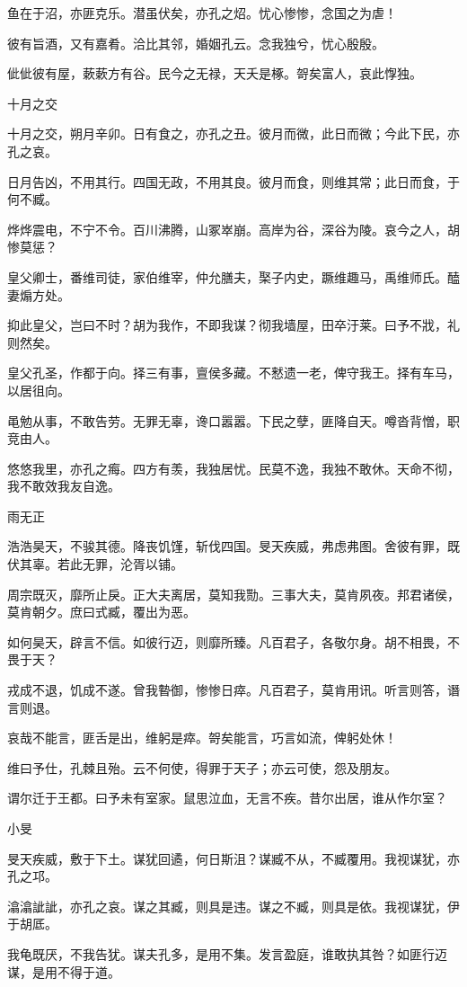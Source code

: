 鱼在于沼，亦匪克乐。潜虽伏矣，亦孔之炤。忧心惨惨，念国之为虐！

彼有旨酒，又有嘉肴。洽比其邻，婚姻孔云。念我独兮，忧心殷殷。

佌佌彼有屋，蔌蔌方有谷。民今之无禄，天夭是椓。哿矣富人，哀此惸独。

十月之交

十月之交，朔月辛卯。日有食之，亦孔之丑。彼月而微，此日而微；今此下民，亦孔之哀。

日月告凶，不用其行。四国无政，不用其良。彼月而食，则维其常；此日而食，于何不臧。

烨烨震电，不宁不令。百川沸腾，山冢崒崩。高岸为谷，深谷为陵。哀今之人，胡惨莫惩？

皇父卿士，番维司徒，家伯维宰，仲允膳夫，棸子内史，蹶维趣马，禹维师氏。醘妻煽方处。

抑此皇父，岂曰不时？胡为我作，不即我谋？彻我墙屋，田卒汙莱。曰予不戕，礼则然矣。

皇父孔圣，作都于向。择三有事，亶侯多藏。不慭遗一老，俾守我王。择有车马，以居徂向。

黾勉从事，不敢告劳。无罪无辜，谗口嚣嚣。下民之孽，匪降自天。噂沓背憎，职竞由人。

悠悠我里，亦孔之痗。四方有羡，我独居忧。民莫不逸，我独不敢休。天命不彻，我不敢效我友自逸。

雨无正

浩浩昊天，不骏其德。降丧饥馑，斩伐四国。旻天疾威，弗虑弗图。舍彼有罪，既伏其辜。若此无罪，沦胥以铺。

周宗既灭，靡所止戾。正大夫离居，莫知我勚。三事大夫，莫肯夙夜。邦君诸侯，莫肯朝夕。庶曰式臧，覆出为恶。

如何昊天，辟言不信。如彼行迈，则靡所臻。凡百君子，各敬尔身。胡不相畏，不畏于天？

戎成不退，饥成不遂。曾我暬御，惨惨日瘁。凡百君子，莫肯用讯。听言则答，谮言则退。

哀哉不能言，匪舌是出，维躬是瘁。哿矣能言，巧言如流，俾躬处休！

维曰予仕，孔棘且殆。云不何使，得罪于天子；亦云可使，怨及朋友。

谓尔迁于王都。曰予未有室家。鼠思泣血，无言不疾。昔尔出居，谁从作尔室？

小旻

旻天疾威，敷于下土。谋犹回遹，何日斯沮？谋臧不从，不臧覆用。我视谋犹，亦孔之邛。

潝潝訿訿，亦孔之哀。谋之其臧，则具是违。谋之不臧，则具是依。我视谋犹，伊于胡厎。

我龟既厌，不我告犹。谋夫孔多，是用不集。发言盈庭，谁敢执其咎？如匪行迈谋，是用不得于道。

